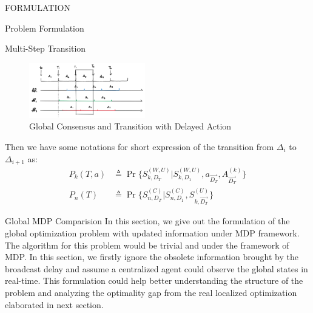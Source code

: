 \documentclass[10pt, conference, letterpaper]{IEEEtran}
\begin{document}
\begin{section}{FORMULATION}
\begin{subsection}{Problem Formulation}
\begin{subsubsection}{Multi-Step Transition}
                \begin{figure}[h]
                    \centering
                    \includegraphics[width=0.45\textwidth]{broadcast-trans.png}
                    \caption{Global Consensus and Transition with Delayed Action}
                    \label{fig:br-trans}
                \end{figure}
                Then we have some notations for short expression of the transition from $\Delta_{i}$ to $\Delta_{i+1}$ as:
                \begin{align}
                    P_k(T,a) &\triangleq \Pr\{ S^{(W,U)}_{k,D_T}|S^{(W,U)}_{k,D_1}, a_{\vec{D_T}},A^{(k)}_{\vec{D_T} }\}
                    \\
                    P_n(T) &\triangleq \Pr\{ S^{(C)}_{n,D_T}|S^{(C)}_{n,D_1}, S^{(U)}_{k,\vec{D_T}} \}
                \end{align}
            \end{subsubsection}

        \end{subsection}

        \begin{subsection}{Global MDP Comparision}
            In this section, we give out the formulation of the global optimization problem with updated information under MDP framework. The algorithm for this problem would be trivial and 
            under the framework of MDP. In this section, we firstly ignore the obsolete information brought by the broadcast delay and assume a centralized agent could observe the global states in real-time. This formulation could help better understanding the structure of the problem and analyzing the optimality gap from the real localized optimization elaborated in next section.


\end{subsection}
\end{section}
\end{document}
